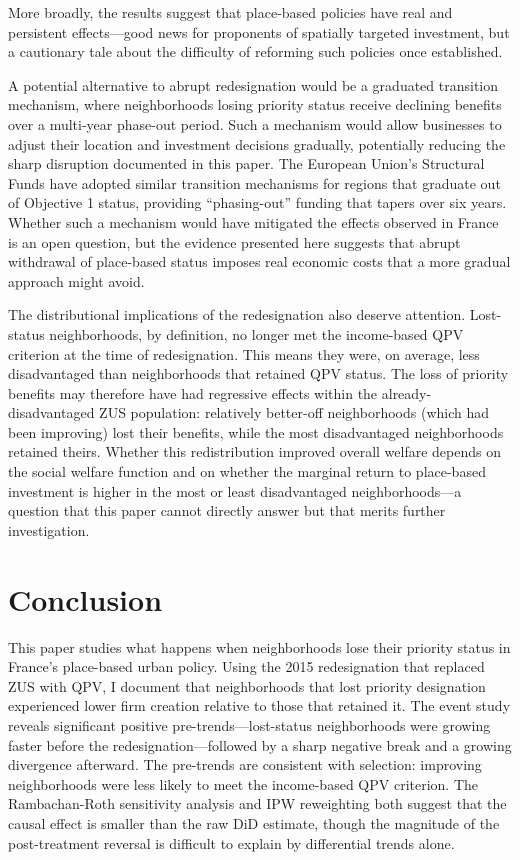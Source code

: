 \documentclass[12pt]{article}
\begin{document}
More broadly, the results suggest that place-based policies have real and persistent effects---good news for proponents of spatially targeted investment, but a cautionary tale about the difficulty of reforming such policies once established.

A potential alternative to abrupt redesignation would be a graduated transition mechanism, where neighborhoods losing priority status receive declining benefits over a multi-year phase-out period. Such a mechanism would allow businesses to adjust their location and investment decisions gradually, potentially reducing the sharp disruption documented in this paper. The European Union's Structural Funds have adopted similar transition mechanisms for regions that graduate out of Objective 1 status, providing ``phasing-out'' funding that tapers over six years. Whether such a mechanism would have mitigated the effects observed in France is an open question, but the evidence presented here suggests that abrupt withdrawal of place-based status imposes real economic costs that a more gradual approach might avoid.

The distributional implications of the redesignation also deserve attention. Lost-status neighborhoods, by definition, no longer met the income-based QPV criterion at the time of redesignation. This means they were, on average, less disadvantaged than neighborhoods that retained QPV status. The loss of priority benefits may therefore have had regressive effects within the already-disadvantaged ZUS population: relatively better-off neighborhoods (which had been improving) lost their benefits, while the most disadvantaged neighborhoods retained theirs. Whether this redistribution improved overall welfare depends on the social welfare function and on whether the marginal return to place-based investment is higher in the most or least disadvantaged neighborhoods---a question that this paper cannot directly answer but that merits further investigation.


\section{Conclusion}

This paper studies what happens when neighborhoods lose their priority status in France's place-based urban policy. Using the 2015 redesignation that replaced ZUS with QPV, I document that neighborhoods that lost priority designation experienced lower firm creation relative to those that retained it. The event study reveals significant positive pre-trends---lost-status neighborhoods were growing faster before the redesignation---followed by a sharp negative break and a growing divergence afterward. The pre-trends are consistent with selection: improving neighborhoods were less likely to meet the income-based QPV criterion. The Rambachan-Roth sensitivity analysis and IPW reweighting both suggest that the causal effect is smaller than the raw DiD estimate, though the magnitude of the post-treatment reversal is difficult to explain by differential trends alone.
\end{document}
